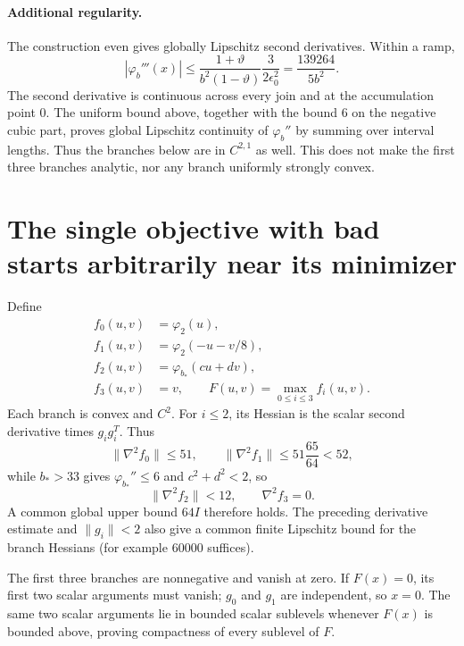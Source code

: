 \paragraph{Additional regularity.}
The construction even gives globally Lipschitz second derivatives. Within a ramp,
\[
 |\varphi_b'''(x)|
 \le\frac{1+\vartheta}{b^2(1-\vartheta)}
       \frac{3}{2\epsilon_0^2}
 =\frac{139264}{5b^2}.
\]
The second derivative is continuous across every join and at the accumulation point $0$. The uniform bound above, together with the bound $6$ on the negative cubic part, proves global Lipschitz continuity of $\varphi_b''$ by summing over interval lengths. Thus the branches below are in $C^{2,1}$ as well. This does not make the first three branches analytic, nor any branch uniformly strongly convex.


\setcounter{section}{4}
\setcounter{theorem}{1}
\setcounter{lemma}{2}
\setcounter{corollary}{0}
\setcounter{proposition}{0}
\setcounter{remark}{0}
\setcounter{equation}{11}


\section{The single objective with bad starts arbitrarily near its minimizer}
Define
\begin{equation}\label{D:fullobjective}
\begin{split}
 f_0(u,v)&=\varphi_2(u),\\
 f_1(u,v)&=\varphi_2(-u-v/8),\\
 f_2(u,v)&=\varphi_{b_*}(cu+dv),\\
 f_3(u,v)&=v,\qquad F(u,v)=\max_{0\le i\le3}f_i(u,v).
\end{split}
\end{equation}
Each branch is convex and $C^2$. For $i\le2$, its Hessian is the scalar second derivative times $g_i g_i^T$. Thus
\[
 \|\nabla^2f_0\|\le51,\qquad
 \|\nabla^2f_1\|\le51\frac{65}{64}<52,
\]
while $b_*>33$ gives $\varphi_{b_*}''\le6$ and $c^2+d^2<2$, so
\[
 \|\nabla^2f_2\|<12,\qquad\nabla^2f_3=0.
\]
A common global upper bound $64I$ therefore holds. The preceding derivative estimate and $\|g_i\|<2$ also give a common finite Lipschitz bound for the branch Hessians (for example $60000$ suffices).

The first three branches are nonnegative and vanish at zero. If $F(x)=0$, its first two scalar arguments must vanish; $g_0$ and $g_1$ are independent, so $x=0$. The same two scalar arguments lie in bounded scalar sublevels whenever $F(x)$ is bounded above, proving compactness of every sublevel of $F$.

